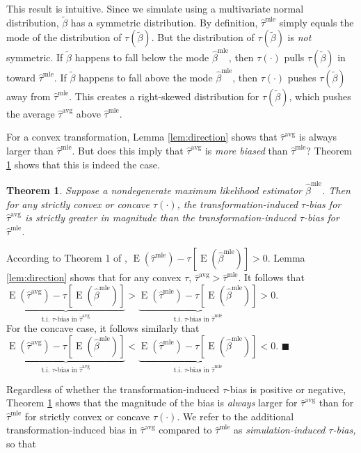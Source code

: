 \documentclass[11pt]{article}
\newtheorem{theorem}{Theorem}
\newenvironment{proof}[1][Proof]{\begin{trivlist}
\item[\hskip \labelsep {\bfseries #1}]}{\end{trivlist}}
\DeclareMathOperator*{\E}{\text{E}}
\begin{document}
\noindent This result is intuitive. Since we simulate using a multivariate normal distribution, $\tilde{\beta}$ has a symmetric distribution. By definition, $\hat{\tau}^\text{mle}$ simply equals the mode of the distribution of $\tau(\tilde{\beta})$. But the distribution of $\tau(\tilde{\beta})$ is \emph{not} symmetric. If $\tilde{\beta}$ happens to fall below the mode $\hat{\beta}^\text{mle}$, then $\tau(\cdot)$ pulls $\tau(\tilde{\beta})$ in toward $\hat{\tau}^\text{mle}$.
If $\tilde{\beta}$ happens to fall above the mode $\hat{\beta}^\text{mle}$, then $\tau(\cdot)$ pushes $\tau(\tilde{\beta})$ away from $\hat{\tau}^\text{mle}$. This creates a right-skewed distribution for $\tau(\tilde{\beta})$, which pushes the average $\hat{\tau}^\text{avg}$ above $\hat{\tau}^\text{mle}$.

For a convex transformation, Lemma \ref{lem:direction} shows that $\hat{\tau}^\text{avg}$ is always larger than $\hat{\tau}^\text{mle}$.
But does this imply that $\hat{\tau}^\text{avg}$ is \textit{more biased} than $\hat{\tau}^\text{mle}$? Theorem \ref{thm:direction} shows that this is indeed the case.

\begin{theorem}\label{thm:direction}
Suppose a nondegenerate maximum likelihood estimator $\hat{\beta}^\text{mle}$.
Then for any strictly convex or concave $\tau(\cdot)$, the transformation-induced $\tau$-bias for $\hat{\tau}^{\text{avg}}$ is strictly greater in magnitude than the transformation-induced $\tau$-bias for $\hat{\tau}^{\text{mle}}$.
\end{theorem}
\begin{proof}
According to Theorem 1 of \citet[p. 405]{Rainey2017}, $\E \left( \hat{\tau}^\text{mle}\right) -  \tau \left[\E \left( \hat{\beta}^\text{mle} \right) \right] > 0$.
Lemma \ref{lem:direction} shows that for any convex $\tau$, $\hat{\tau}^{\text{avg}} > \hat{\tau}^\text{mle}$.
It follows that $\underbrace{\E \left( \hat{\tau}^\text{avg}\right) - \tau \left[\E \left( \hat{\beta}^\text{mle} \right) \right]}_{\text{t.i. } \tau\text{-bias in }\hat{\tau}^{\text{avg}}} > \underbrace{\E \left( \hat{\tau}^\text{mle}\right) -  \tau \left[\E \left( \hat{\beta}^\text{mle} \right) \right]}_{\text{t.i. } \tau\text{-bias in }\hat{\tau}^{\text{mle}}} > 0$.\\

\noindent For the concave case, it follows similarly that $\underbrace{\E \left( \hat{\tau}^\text{avg}\right) - \tau \left[\E \left( \hat{\beta}^\text{mle} \right) \right]}_{\text{t.i. } \tau\text{-bias in }\hat{\tau}^{\text{avg}}} < \underbrace{\E \left( \hat{\tau}^\text{mle}\right) -  \tau \left[\E \left( \hat{\beta}^\text{mle} \right) \right]}_{\text{t.i. } \tau\text{-bias in }\hat{\tau}^{\text{mle}}} < 0$.
 $\blacksquare$
\end{proof}
Regardless of whether the transformation-induced $\tau$-bias is positive or negative, Theorem \ref{thm:direction} shows that the magnitude of the bias is \textit{always} larger for $\hat{\tau}^{\text{avg}}$ than for  $\hat{\tau}^{\text{mle}}$ for strictly convex or concave $\tau(\cdot)$. We refer to the additional transformation-induced bias in $\hat{\tau}^\text{avg}$ compared to $\hat{\tau}^\text{mle}$ as {\it simulation-induced $\tau$-bias,} so that
\end{document}
